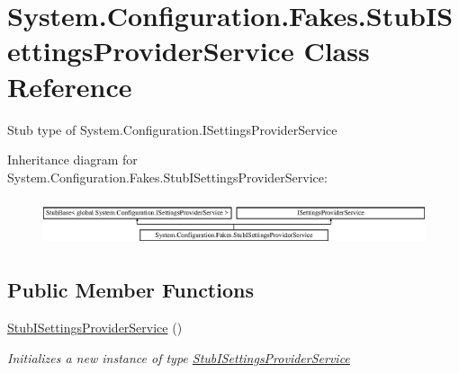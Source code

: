 \hypertarget{class_system_1_1_configuration_1_1_fakes_1_1_stub_i_settings_provider_service}{\section{System.\-Configuration.\-Fakes.\-Stub\-I\-Settings\-Provider\-Service Class Reference}
\label{class_system_1_1_configuration_1_1_fakes_1_1_stub_i_settings_provider_service}
}


Stub type of System.\-Configuration.\-I\-Settings\-Provider\-Service 


Inheritance diagram for System.\-Configuration.\-Fakes.\-Stub\-I\-Settings\-Provider\-Service\-:\begin{figure}[H]
\begin{center}
\leavevmode
\includegraphics[height=1.403509cm]{class_system_1_1_configuration_1_1_fakes_1_1_stub_i_settings_provider_service}
\end{center}
\end{figure}
\subsection*{Public Member Functions}
\begin{DoxyCompactItemize}
\item 
\hyperlink{class_system_1_1_configuration_1_1_fakes_1_1_stub_i_settings_provider_service_a7a90998217a7cc6fa72fb99178a0651d}{Stub\-I\-Settings\-Provider\-Service} ()
\begin{DoxyCompactList}\small\item\em Initializes a new instance of type \hyperlink{class_system_1_1_configuration_1_1_fakes_1_1_stub_i_settings_provider_service}{Stub\-I\-Settings\-Provider\-Service}\end{DoxyCompactList}\end{DoxyCompactItemize}
